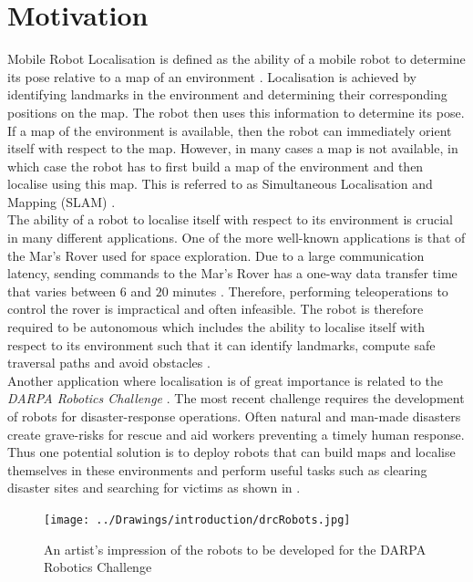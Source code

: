 \documentclass{report}
\begin{document}
\section{Motivation}
\label{sec:motivation}
Mobile Robot Localisation is defined as the ability of a mobile robot to determine its pose relative to a map of an environment \cite{Thrun2002}. Localisation is achieved by identifying landmarks in the environment and determining their corresponding positions on the map. The robot then uses this information to determine its pose. If a map of the environment is available, then the robot can immediately orient itself with respect to the map. However, in many cases a map is not available, in which case the robot has to first build a map of the environment and then localise using this map. This is referred to as Simultaneous Localisation and Mapping (SLAM) \cite{Durrant2006, Bailey2006b}.\\

The ability of a robot to localise itself with respect to its environment is crucial in many different applications. One of the more well-known applications is that of the Mar's Rover used for space exploration. Due to a large communication latency, sending commands to the Mar's Rover has a one-way data transfer time that varies between $6$ and $20$ minutes \cite{Powell2006}. Therefore, performing teleoperations to control the rover is impractical and often infeasible. The robot is therefore required to be autonomous which includes the ability to localise itself with respect to its environment such that it can identify landmarks, compute safe traversal paths and avoid obstacles \cite{Powell2006}.\\

Another application where localisation is of great importance is related to the \textit{DARPA Robotics Challenge} \cite{darpa}. The most recent challenge requires the development of robots for disaster-response operations. Often natural and man-made disasters create grave-risks for rescue and aid workers preventing a timely human response. Thus one potential solution is to deploy robots that can build maps and localise themselves in these environments and perform useful tasks such as clearing disaster sites and searching for victims as shown in  \cite{darpa}.\\   

\begin{figure}[h!] 
  \centering
    \texttt{[image: ../Drawings/introduction/drcRobots.jpg]}
    \caption{An artist's impression of the robots to be developed for the DARPA Robotics Challenge}
    \label{fig:darpa}
\end{figure}
\end{document}
